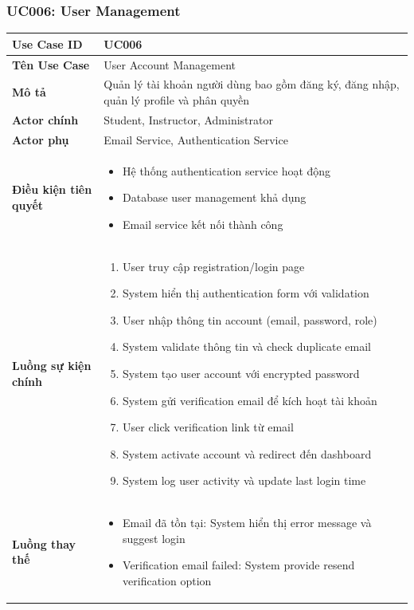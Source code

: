 \subsubsection{UC006: User Management}

\begin{longtable}{|p{4cm}|p{10cm}|}
\hline
\textbf{Use Case ID} & UC006 \\ \hline
\textbf{Tên Use Case} & User Account Management \\ \hline
\textbf{Mô tả} & Quản lý tài khoản người dùng bao gồm đăng ký, đăng nhập, quản lý profile và phân quyền \\ \hline
\textbf{Actor chính} & Student, Instructor, Administrator \\ \hline
\textbf{Actor phụ} & Email Service, Authentication Service \\ \hline
\textbf{Điều kiện tiên quyết} & 
\begin{itemize}
    \item Hệ thống authentication service hoạt động
    \item Database user management khả dụng
    \item Email service kết nối thành công
\end{itemize} \\ \hline
\textbf{Luồng sự kiện chính} & 
\begin{enumerate}
    \item User truy cập registration/login page
    \item System hiển thị authentication form với validation
    \item User nhập thông tin account (email, password, role)
    \item System validate thông tin và check duplicate email
    \item System tạo user account với encrypted password
    \item System gửi verification email để kích hoạt tài khoản
    \item User click verification link từ email
    \item System activate account và redirect đến dashboard
    \item System log user activity và update last login time
\end{enumerate} \\ \hline
\textbf{Luồng thay thế} & 
\begin{itemize}
    \item Email đã tồn tại: System hiển thị error message và suggest login
    \item Verification email failed: System provide resend verification option

\end{itemize}
\end{longtable}
